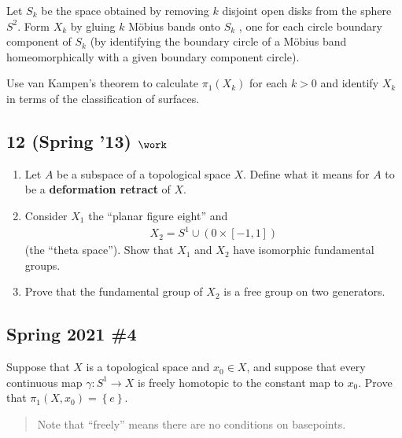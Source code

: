 Let \(S_k\) be the space obtained by removing \(k\) disjoint open disks
from the sphere \(S^2\). Form \(X_k\) by gluing \(k\) Möbius bands onto
\(S_k\) , one for each circle boundary component of \(S_k\) (by
identifying the boundary circle of a Möbius band homeomorphically with a
given boundary component circle).

Use van Kampen's theorem to calculate \(\pi_1 (X_k)\) for each \(k > 0\)
and identify \(X_k\) in terms of the classification of surfaces.

\hypertarget{spring-13-work-2}{%
\subsection{\texorpdfstring{12 (Spring '13)
\(\work\)}{12 (Spring '13) \textbackslash work}}\label{spring-13-work-2}}

\begin{enumerate}
\def\labelenumi{\alph{enumi}.}
\item
  Let \(A\) be a subspace of a topological space \(X\). Define what it
  means for \(A\) to be a \textbf{deformation retract} of \(X\).
\item
  Consider \(X_1\) the ``planar figure eight'' and
  \begin{align*}X_2 = S^1 \cup ({0} \times [-1, 1])\end{align*}
  (the ``theta space''). Show that \(X_1\) and \(X_2\) have isomorphic
  fundamental groups.
\item
  Prove that the fundamental group of \(X_2\) is a free group on two
  generators.
\end{enumerate}

\hypertarget{spring-2021-4}{%
\subsection{Spring 2021 \#4}\label{spring-2021-4}}

\begin{problem}[Spring 2021, 4]

Suppose that \(X\) is a topological space and \(x_0\in X\), and suppose
that every continuous map \(\gamma: S^1 \to X\) is freely homotopic to
the constant map to \(x_0\). Prove that
\(\pi_1(X, x_0) = \left\{{ e }\right\}\).

\begin{quote}
Note that ``freely'' means there are no conditions on basepoints.
\end{quote}

\end{problem}

